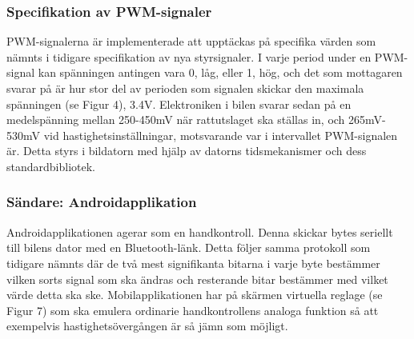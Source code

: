 \documentclass[a4paper]{article}
\begin{document}
\subsubsection{Specifikation av PWM-signaler}
PWM-signalerna är implementerade att upptäckas på specifika värden som nämnts i tidigare specifikation av nya styrsignaler. I varje period under en PWM-signal kan spänningen antingen vara 0, låg, eller 1, hög, och det som mottagaren svarar på är hur stor del av perioden som signalen skickar den maximala spänningen (se Figur 4), 3.4V. Elektroniken i bilen svarar sedan på en medelspänning mellan 250-450mV när rattutslaget ska ställas in, och 265mV-530mV vid hastighetsinställningar, motsvarande var i intervallet PWM-signalen är. Detta styrs i bildatorn med hjälp av datorns tidsmekanismer och dess standardbibliotek.

\subsubsection{Sändare: Androidapplikation}
Androidapplikationen agerar som en handkontroll. Denna skickar bytes seriellt till bilens dator med en Bluetooth-länk. Detta följer samma protokoll som tidigare nämnts där de två mest signifikanta bitarna i varje byte bestämmer vilken sorts signal som ska ändras och resterande bitar bestämmer med vilket värde detta ska ske. Mobilapplikationen har på skärmen virtuella reglage (se Figur 7) som ska emulera ordinarie handkontrollens analoga funktion så att exempelvis hastighetsövergången är så jämn som möjligt.
\end{document}
